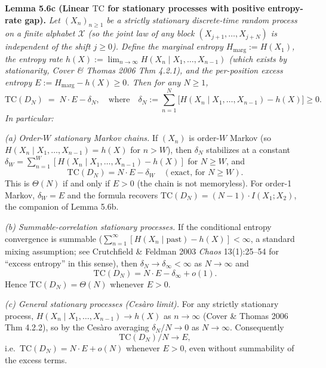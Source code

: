 \documentclass[
]{article}
\begin{document}
\textbf{Lemma 5.6c (Linear $\mathrm{TC}$ for stationary processes
with positive entropy-rate gap).} \emph{Let $(X_n)_{n \geq 1}$ be a
strictly stationary discrete-time random process on a finite
alphabet $\mathcal{X}$ (so the joint law of any block
$(X_{j+1}, \ldots, X_{j+N})$ is independent of the shift $j \geq 0$).
Define the marginal entropy
$H_{\mathrm{marg}} := H(X_1)$, the entropy rate
$h(X) := \lim_{n \to \infty} H(X_n \mid X_1, \ldots, X_{n-1})$
(which exists by stationarity, Cover \& Thomas 2006 Thm 4.2.1),
and the per-position excess entropy
$E := H_{\mathrm{marg}} - h(X) \geq 0$. Then for any $N \geq 1$,}
\[
\mathrm{TC}(D_N) \;=\; N \cdot E - \delta_N,
\quad\text{where}\quad
\delta_N := \sum_{n=1}^N \bigl[H(X_n \mid X_1, \ldots, X_{n-1}) - h(X)\bigr] \geq 0.
\tag{5.7}
\]
\emph{In particular:}

\emph{(a) Order-$W$ stationary Markov chains.} If $(X_n)$ is order-$W$
Markov (so $H(X_n \mid X_1, \ldots, X_{n-1}) = h(X)$ for $n > W$),
then $\delta_N$ stabilizes at a constant
$\delta_W = \sum_{n=1}^W [H(X_n \mid X_1, \ldots, X_{n-1}) - h(X)]$
for $N \geq W$, and
\[
\mathrm{TC}(D_N) = N \cdot E - \delta_W \quad (\text{exact, for } N \geq W).
\]
This is $\Theta(N)$ if and only if $E > 0$ (the chain is not
memoryless). For order-1 Markov, $\delta_W = E$ and the formula
recovers $\mathrm{TC}(D_N) = (N-1) \cdot I(X_1; X_2)$, the companion
of Lemma 5.6b.

\emph{(b) Summable-correlation stationary processes.} If the
conditional entropy convergence is summable
($\sum_{n=1}^\infty [H(X_n \mid \mathrm{past}) - h(X)] < \infty$,
a standard mixing assumption; see Crutchfield \& Feldman 2003
\emph{Chaos} 13(1):25--54 for ``excess entropy'' in this sense),
then $\delta_N \to \delta_\infty < \infty$ as $N \to \infty$ and
\[
\mathrm{TC}(D_N) = N \cdot E - \delta_\infty + o(1).
\]
Hence $\mathrm{TC}(D_N) = \Theta(N)$ whenever $E > 0$.

\emph{(c) General stationary processes (Ces\`aro limit).} For any
strictly stationary process, $H(X_n \mid X_1, \ldots, X_{n-1}) \to h(X)$
as $n \to \infty$ (Cover \& Thomas 2006 Thm 4.2.2), so by the Ces\`aro
averaging
$\delta_N / N \to 0$
as $N \to \infty$. Consequently
\[
\mathrm{TC}(D_N) / N \to E,
\]
i.e.\ $\mathrm{TC}(D_N) = N \cdot E + o(N)$ whenever $E > 0$, even
without summability of the excess terms.
\end{document}
